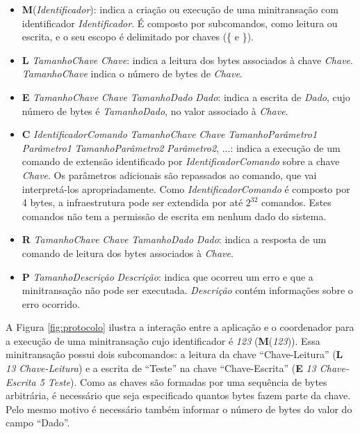 \documentclass[11pt,twoside,a4paper]{book}
\begin{document}
\begin{itemize}
    \item \textbf{M}(\textit{Identificador}): indica a criação ou execução de uma minitransação com identificador \textit{Identificador}. É composto por subcomandos, como leitura ou escrita, e o seu escopo é delimitado por chaves (\{ e \}).

    \item \textbf{L} \textit{TamanhoChave} \textit{Chave}: indica a leitura dos bytes associados à chave \textit{Chave}. \textit{TamanhoChave} indica o número de bytes de \textit{Chave}.

    \item \textbf{E} \textit{TamanhoChave} \textit{Chave} \textit{TamanhoDado} \textit{Dado}: indica a escrita de \textit{Dado}, cujo número de bytes é \textit{TamanhoDado}, no valor associado à \textit{Chave}.

    \item \textbf{C} \textit{IdentificadorComando} \textit{TamanhoChave} \textit{Chave} \textit{TamanhoParâmetro1} \textit{Parâmetro1} \textit{TamanhoParâmetro2} \textit{Parâmetro2}, ...: indica a execução de um comando de extensão identificado por \textit{IdentificadorComando} sobre a chave \textit{Chave}. Os parâmetros adicionais são repassados ao comando, que vai interpretá-los apropriadamente. Como \textit{IdentificadorComando} é composto por 4 bytes, a infraestrutura pode ser extendida por até $2^{32}$ comandos. Estes comandos não tem a permissão de escrita em nenhum dado do sistema.

    \item \textbf{R} \textit{TamanhoChave} \textit{Chave} \textit{TamanhoDado} \textit{Dado}: indica a resposta de um comando de leitura dos bytes associados à \textit{Chave}.

    \item \textbf{P} \textit{TamanhoDescrição} \textit{Descrição}: indica que ocorreu um erro e que a minitransação não pode ser executada. \textit{Descrição} contém informações sobre o erro ocorrido.
\end{itemize}

A Figura \ref{fig:protocolo} ilustra a interação entre a aplicação e o coordenador para a execução de uma minitransação cujo identificador é \textit{123} (\textbf{M}(\textit{123})). Essa minitransação possui dois subcomandos: a leitura da chave ``Chave-Leitura'' (\textbf{L} \textit{13 Chave-Leitura}) e a escrita de ``Teste'' na chave ``Chave-Escrita'' (\textbf{E} \textit{13 Chave-Escrita 5 Teste}). Como as chaves são formadas por uma sequência de bytes arbitrária, é necessário que seja especificado quantos bytes fazem parte da chave. Pelo mesmo motivo é necessário também informar o número de bytes do valor do campo ``Dado''.
\end{document}
